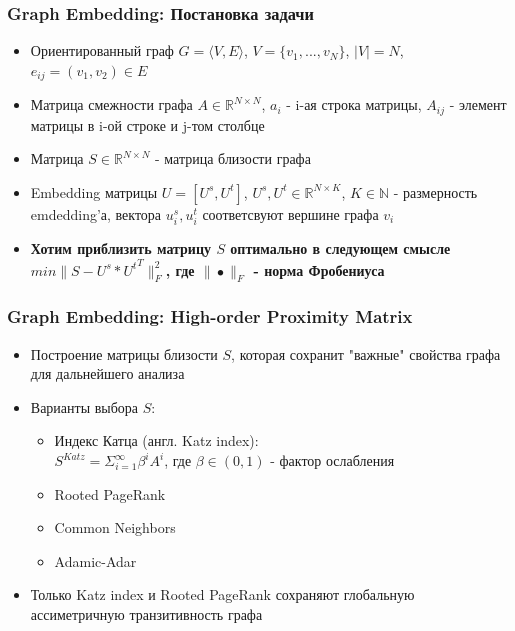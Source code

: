 \documentclass[xcolor=table,english]{beamer}
\begin{document}
\begin{frame}[fragile] \frametitle{Graph Embedding: Постановка задачи}
    \begin{itemize}
        \item Ориентированный граф $G = \langle V, E \rangle$, $V = \{ v_1, ... , v_N \}$, $|V| = N$, $e_{ij}=(v_1, v_2) \in E$
        \item Матрица смежности графа $A \in \mathbb{R}^{N \times N}$, $a_i$ - i-ая строка матрицы, $A_{ij}$ - элемент матрицы в i-ой строке и j-том столбце
        \item Матрица $S \in \mathbb{R}^{N \times N}$ - матрица близости графа
        \item Embedding матрицы $U = [U^s, U^t]$, $U^s, U^t \in \mathbb{R}^{N \times K}$, $K \in \mathbb{N}$ - размерность emdedding'а, вектора $u^s_i, u^t_i$ соответсвуют вершине графа $v_i$
        \item \textbf{Хотим приблизить матрицу $S$ оптимально в следующем смысле $min \| S - U^s * {U^t}^T \|^2_F$, где $\| \bullet \|_F$ - норма Фробениуса} 
    \end{itemize}
\end{frame}

\begin{frame}[fragile] \frametitle{Graph Embedding: High-order Proximity Matrix}
    \begin{itemize}
        \item Построение матрицы близости $S$, которая сохранит "важные" свойства графа для дальнейшего анализа
        \item Варианты выбора $S$:
        {
            \begin{itemize}
                \item Индекс Катца (англ. Katz index): \\$S^{Katz} = \Sigma_{i=1}^{\infty} \beta^i A^i$, где $\beta \in (0, 1)$ - фактор ослабления
                \item Rooted PageRank
                \item Common Neighbors
                \item Adamic-Adar
            \end{itemize}
        }
        \item Только Katz index и Rooted PageRank сохраняют глобальную ассиметричную транзитивность графа
    \end{itemize}
\end{frame}
\end{document}
